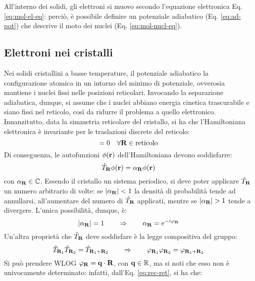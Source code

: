 All'interno dei solidi, gli elettroni si muovo secondo l'equazione elettronica Eq. \ref{eq:mol-el-eq}: perciò, è possibile definire un potenziale adiabatico (Eq. \ref{eq:ad-pot}) che descrive il moto dei nuclei (Eq. \ref{eq:mol-nucl-eq}).

\subsection{Elettroni nei cristalli}

Nei solidi cristallini a basse temperature, il potenziale adiabatico la configurazione atomica in un intorno del minimo di potenziale, ovverosia mantiene i nuclei fissi nelle posizioni reticolari. Invocando la separazione adiabatica, dunque, si assume che i nuclei abbiano energia cinetica trascurabile e siano fissi nel reticolo, così da ridurre il problema a quello elettronico. \\
Innanzitutto, data la simmetria reticolare del cristallo, si ha che l'Hamiltoniana elettronica è invariante per le traslazioni discrete del reticolo:
\begin{equation}
	[\hat{\mathcal{H}} , \hat{T}_\ve{R}] = 0 \quad \forall \ve{R} \in \text{reticolo}
\end{equation}
Di conseguenza, le autofunzioni $ \phi(\mathbf{r}) $ dell'Hamiltoniana devono soddisfarre:
\begin{equation}
	\hat{T}_{\mathbf{R}} \phi(\mathbf{r}) = \alpha_{\mathbf{R}} \phi(\mathbf{r})
\end{equation}
con $ \alpha_{\mathbf{R}} \in \mathbb{C} $. Essendo il cristallo un sistema periodico, si deve poter applicare $ \hat{T}_{\mathbf{R}} $ un numero arbitrario di volte: se $ \left\lvert\alpha_{\mathbf{R}}\right\rvert < 1 $ la densità di probabilità tende ad annullarsi, all'aumentare del numero di $ \hat{T}_{\mathbf{R}} $ applicati, mentre se $ \left\lvert\alpha_{\mathbf{R}}\right\rvert > 1 $ tende a divergere. L'unica possibilità, dunque, è:
\begin{equation*}
	\left\lvert\alpha_{\mathbf{R}}\right\rvert = 1
	\qquad \Rightarrow \qquad
	\alpha_{\mathbf{R}} = e^{-i \varphi_{\mathbf{R}}}
\end{equation*}
Un'altra proprietà che $ \hat{T}_{\mathbf{R}} $ deve soddisfare è la legge compositiva del gruppo:
\begin{equation*}
	\hat{T}_{\mathbf{R}_1} \hat{T}_{\mathbf{R}_2} = \hat{T}_{\mathbf{R}_1 + \mathbf{R}_2}
	\qquad \Rightarrow \qquad
	\varphi_{\mathbf{R}_1} \varphi_{\mathbf{R}_2} = \varphi_{\mathbf{R}_1 + \mathbf{R}_2}
\end{equation*}
Si può prendere WLOG $ \varphi_{\mathbf{R}} = \mathbf{q} \cdot \mathbf{R} $, con $ \mathbf{q} \in \mathbb{R} $, ma si noti che esso non è univocamente determinato: infatti, dall'Eq. \ref{eq:rec-ret}, si ha che:
